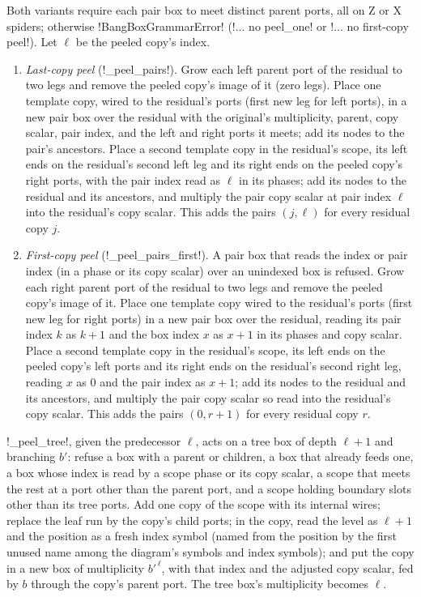 \begin{algorithm}\label{alg:diagrams-peel-pairs}
Both variants require each pair box to meet distinct parent ports, all on Z or X spiders; otherwise \py!BangBoxGrammarError! (\code!... no peel_one! or \code!... no first-copy peel!). Let $\ell$ be the peeled copy's index.
\begin{enumerate}
\item \emph{Last-copy peel} (\py!_peel_pairs!). Grow each left parent port of the residual to two legs and remove the peeled copy's image of it (zero legs). Place one template copy, wired to the residual's ports (first new leg for left ports), in a new pair box over the residual with the original's multiplicity, parent, copy scalar, pair index, and the left and right ports it meets; add its nodes to the pair's ancestors. Place a second template copy in the residual's scope, its left ends on the residual's second left leg and its right ends on the peeled copy's right ports, with the pair index read as $\ell$ in its phases; add its nodes to the residual and its ancestors, and multiply the pair copy scalar at pair index $\ell$ into the residual's copy scalar. This adds the pairs $(j,\ell)$ for every residual copy $j$.
\item \emph{First-copy peel} (\py!_peel_pairs_first!). A pair box that reads the index or pair index (in a phase or its copy scalar) over an unindexed box is refused. Grow each right parent port of the residual to two legs and remove the peeled copy's image of it. Place one template copy wired to the residual's ports (first new leg for right ports) in a new pair box over the residual, reading its pair index $k$ as $k+1$ and the box index $x$ as $x+1$ in its phases and copy scalar. Place a second template copy in the residual's scope, its left ends on the peeled copy's left ports and its right ends on the residual's second right leg, reading $x$ as $0$ and the pair index as $x+1$; add its nodes to the residual and its ancestors, and multiply the pair copy scalar so read into the residual's copy scalar. This adds the pairs $(0, r+1)$ for every residual copy $r$.
\end{enumerate}
\end{algorithm}

\begin{algorithm}\label{alg:diagrams-peel-tree}
\py!_peel_tree!, given the predecessor $\ell$, acts on a tree box of depth $\ell+1$ and branching $b'$: refuse a box with a parent or children, a box that already feeds one, a box whose index is read by a scope phase or its copy scalar, a scope that meets the rest at a port other than the parent port, and a scope holding boundary slots other than its tree ports. Add one copy of the scope with its internal wires; replace the leaf run by the copy's child ports; in the copy, read the level as $\ell+1$ and the position as a fresh index symbol (named from the position by the first unused name among the diagram's symbols and index symbols); and put the copy in a new box of multiplicity $b'^{\,\ell}$, with that index and the adjusted copy scalar, fed by $b$ through the copy's parent port. The tree box's multiplicity becomes $\ell$.
\end{algorithm}

